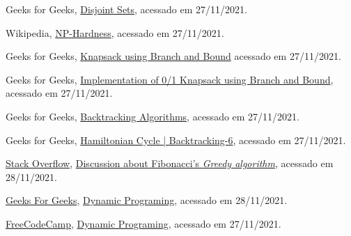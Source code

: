 \begin{thebibliography}{10}

  Geeks for Geeks,
  \href{https://www.geeksforgeeks.org/disjoint-set-data-structures/}{Disjoint Sets},
  acessado em 27/11/2021.

  Wikipedia,
  \href{https://en.wikipedia.org/wiki/NP-hardness}{NP-Hardness},
  acessado em 27/11/2021.
  
  Geeks for Geeks,
  \href{https://www.geeksforgeeks.org/0-1-knapsack-using-branch-and-bound/}{Knapsack using Branch and Bound}
  acessado em 27/11/2021.
  
  Geeks for Geeks,
  \href{https://www.geeksforgeeks.org/implementation-of-0-1-knapsack-using-branch-and-bound/}{Implementation of 0/1 Knapsack using Branch and Bound},
  acessado em 27/11/2021.
  
  Geeks for Geeks,
  \href{https://www.geeksforgeeks.org/backtracking-algorithms/#standard}{Backtracking Algorithms},
  acessado em 27/11/2021.

  Geeks for Geeks,
  \href{https://www.geeksforgeeks.org/hamiltonian-cycle-backtracking-6/}{Hamiltonian Cycle | Backtracking-6},
  acessado em 27/11/2021.


  \href{https://stackoverflow.com/}{Stack Overflow},
  \href{https://stackoverflow.com/questions/52869474/implementing-fibonacci-series-using-greedy-approach}{Discussion about Fibonacci's \emph{Greedy algorithm}},
  acessado em 28/11/2021. 

  \href{https://www.geeksforgeeks.org/}{Geeks For Geeks},
  \href{https://www.geeksforgeeks.org/dynamic-programming/}{Dynamic Programing},
  acessado em 28/11/2021.
  
    \href{https://www.freecodecamp.org}{FreeCodeCamp},
    \href{https://youtu.be/oBt53YbR9Kk?t=210}{Dynamic Programing},
    acessado em 27/11/2021.



\end{thebibliography}